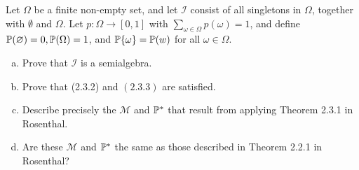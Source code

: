 \begin{problem}
	Let $ \Omega $ be a finite non-empty set, and let $ \mathcal{I} $ consist of all singletons in $ \Omega $, together with $ \emptyset $ and $ \Omega $. Let $ p: \Omega \to [0,1] $ with $ \sum_{\omega \in \Omega}p(\omega) = 1 $, and define $ \mathbb{P}(\varnothing) = 0,\mathbb{P}(\Omega) = 1 $, and $ \mathbb{P}\{\omega\}=\mathbb{P}(w) $ for all $ \omega \in \Omega $.
	\begin{enumerate}[(a)]
		\item Prove that $ \mathcal{I} $ is a semialgebra.
		\item Prove that (2.3.2) and $ (2.3.3) $ are satisfied. 
		\item Describe precisely the $ \mathcal{M} $ and $ \mathbb{P}^* $ that result from applying Theorem 2.3.1 in Rosenthal.
		\item Are these $ \mathcal{M} $ and $ \mathbb{P}^* $ the same as those described in Theorem 2.2.1 in Rosenthal?
 	\end{enumerate}
\end{problem}
